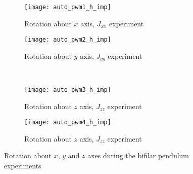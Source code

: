 \begin{appendices}
\begin{figure}[H]
\begin{subfigure}{.5\linewidth}
\centering
\texttt{[image: auto\_pwm1\_h\_imp]}
\caption{Rotation about $x$ axis, $J_{xx}$ experiment}
\label{fig:auto_pwm_h_imp}
\end{subfigure}%
\begin{subfigure}{.5\linewidth}
\centering
\texttt{[image: auto\_pwm2\_h\_imp]}
\caption{Rotation about $y$ axis, $J_{yy}$ experiment}
\label{fig:auto_pwm2_h_imp}
\end{subfigure}\\[1ex]
\begin{subfigure}{0.5\linewidth}
\centering
\texttt{[image: auto\_pwm3\_h\_imp]}
\caption{Rotation about $z$ axis, $J_{zz}$ experiment}
\label{fig:auto_pwm3_h_imp}
\end{subfigure}
\begin{subfigure}{0.5\linewidth}
\centering
\texttt{[image: auto\_pwm4\_h\_imp]}
\caption{Rotation about $z$ axis, $J_{zz}$ experiment}
\label{fig:auto_pwm4_h_imp}
\end{subfigure}
\caption{Rotation about $x$, $y$ and $z$ axes during the bifilar pendulum experiments}
\label{fig:auto_pwm_h}
\end{figure}



\end{appendices}